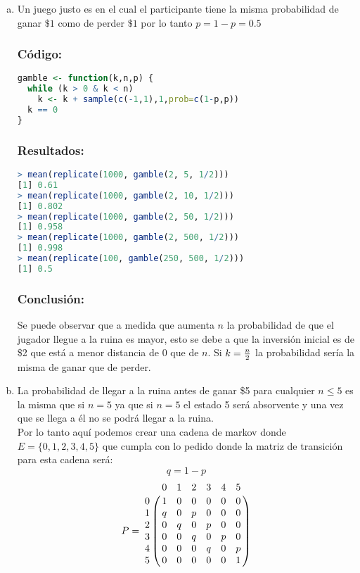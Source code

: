 \documentclass{article}
\begin{document}
\begin{enumerate}[(a)] %
\item Un juego justo es en el cual el participante tiene la misma probabilidad de ganar $\$1$ como de perder $\$1$ por lo tanto $ p = 1 - p = 0.5$



\subsubsection*{Código:}
\begin{lstlisting}[language=R]
gamble <- function(k,n,p) {
  while (k > 0 & k < n) 
    k <- k + sample(c(-1,1),1,prob=c(1-p,p))
  k == 0
}  
\end{lstlisting}

\subsubsection*{Resultados:}
\begin{lstlisting}[language=R]
> mean(replicate(1000, gamble(2, 5, 1/2)))
[1] 0.61
> mean(replicate(1000, gamble(2, 10, 1/2)))
[1] 0.802
> mean(replicate(1000, gamble(2, 50, 1/2)))
[1] 0.958
> mean(replicate(1000, gamble(2, 500, 1/2)))
[1] 0.998
> mean(replicate(100, gamble(250, 500, 1/2)))
[1] 0.5
\end{lstlisting}

\subsubsection*{Conclusión:}
Se puede observar que a medida que aumenta $n$ la probabilidad de que el jugador llegue a la ruina es mayor, esto se debe a que la inversión inicial es de \$2 que está a menor distancia de 0 que de $n$. Si $k = {n\over 2}$ la probabilidad sería la misma de ganar que de perder.

\item La probabilidad de llegar a la ruina antes de ganar \$5 para cualquier $ n \leq 5$ es la misma que si $n = 5$ ya que si $n = 5$ el estado 5 será absorvente y una vez que se llega a él no se podrá llegar a la ruina. \\ Por lo tanto aquí podemos crear una cadena de markov donde $E = \{0,1,2,3,4,5\}$ que cumpla con lo pedido donde la matriz de transición para esta cadena será:
$$ q = 1-p $$
$$
P = 
\bordermatrix{ 
\text{} & 0 & 1 & 2 & 3 & 4 & 5\cr
0&1&0&0&0&0&0 \cr
1&q&0&p&0&0&0 \cr
2&0&q&0&p&0&0 \cr
3&0&0&q&0&p&0 \cr
4&0&0&0&q&0&p \cr
5&0&0&0&0&0&1
}
$$


\end{enumerate}
\end{document}
